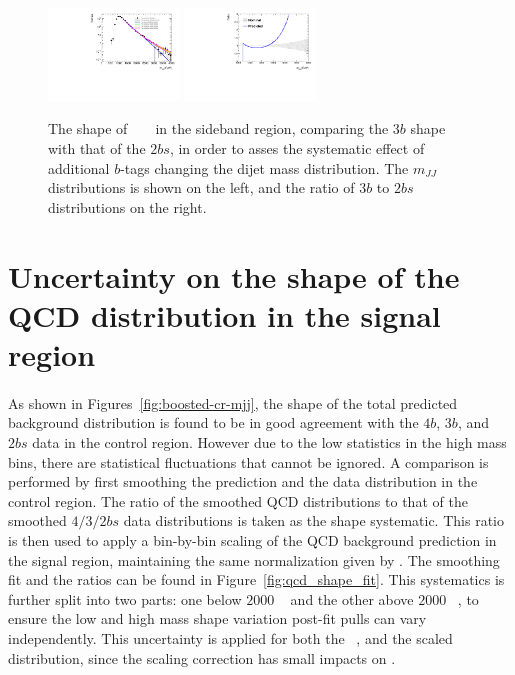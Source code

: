 \begin{figure}[htbp!]
\begin{center} 
\includegraphics[width=0.31\textwidth,angle=-90]{figures/boosted/Syst_Smooth/TopShapeSRSysfitSmooth_sig33_comp22.pdf}
\includegraphics[width=0.31\textwidth,angle=-90]{figures/boosted/Syst_Smooth/TopShapeSRSysfitSmooth_sig33_comp22_ratio.pdf}
\caption{The shape of \ttbar~ \mtwoJ~ in the sideband region,
comparing the $3b$ shape with that of the $2bs$, in order to asses the systematic effect of additional $b$-tags changing the dijet mass distribution.  The $m_{JJ}$ distributions is shown on the left, and the ratio of $3b$ to $2bs$ distributions on the right.}
\label{fig:ttbar-shapes-signal}
\end{center}
\end{figure}


\section{Uncertainty on the shape of the QCD distribution in the signal region}
\label{unc-shape-qcd-in-sr}

\paragraph{}
As shown in Figures~\ref{fig:boosted-cr-mjj}, the shape of the total predicted background distribution is found to be in good agreement with the $4b$, $3b$, and $2bs$ data in the control region. 
However due to the low statistics in the high \mtwoJ mass bins, there are statistical fluctuations that cannot be ignored. 
A comparison is performed by first smoothing the prediction and the data distribution in the control region. 
The ratio of the smoothed QCD distributions to that of the smoothed $4/3/2bs$ data distributions is taken as the shape systematic. 
This ratio is then used to apply a bin-by-bin scaling of the QCD background prediction in the signal region, maintaining the same normalization given by \muqcd.  
The smoothing fit and the ratios can be found in Figure~\ref{fig:qcd_shape_fit}. 
This systematics is further split into two parts: one below $2000$ \GeV~ and the other above $2000$ \GeV~, to ensure the low and high mass shape variation post-fit pulls can vary independently.
This uncertainty is applied for both the \mtwoJ~, and the scaled \mtwoJ~ distribution, since the scaling correction has small impacts on \mtwoJ. 

